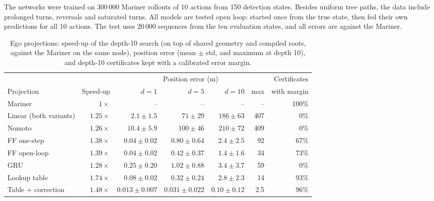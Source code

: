 \documentclass[11pt,a4paper]{article}
\begin{document}
\noindent The networks were trained on 300\,000 Mariner rollouts of 10
actions from 150 detection states. Besides uniform tree paths, the data include
prolonged turns, reversals and saturated turns. All models are tested open
loop: started once from the true state, then fed their own predictions for all
10 actions. The test uses 20\,000 sequences from the ten evaluation states, and
all errors are against the Mariner.

\begin{table}[htbp]
\centering
\caption{Ego projections: speed-up of the depth-10 search (on top of shared
geometry and compiled roots, against the Mariner on the same node), position
error (mean $\pm$ std, and maximum at depth 10), and depth-10 certificates kept
with a calibrated error margin.}
\label{tab:projection}
\small
\begin{tabular}{@{}lrrrrrr@{}}
\toprule
 & & \multicolumn{4}{c}{Position error (m)} & Certificates \\
\cmidrule(lr){3-6}
Projection & Speed-up & $d=1$ & $d=5$ & $d=10$ & max & with margin \\
\midrule
Mariner                  & $1\times$    & -- & -- & -- & -- & 100\% \\
Linear (both variants)   & $1.25\times$ & $2.1 \pm 1.5$ & $71 \pm 29$ & $186 \pm 63$ & 407 & 0\% \\
Nomoto                   & $1.26\times$ & $10.4 \pm 5.9$ & $100 \pm 46$ & $210 \pm 72$ & 409 & 0\% \\
FF one-step              & $1.38\times$ & $0.04 \pm 0.02$ & $0.80 \pm 0.64$ & $2.4 \pm 2.5$ & 92 & 67\% \\
FF open-loop             & $1.39\times$ & $0.04 \pm 0.02$ & $0.42 \pm 0.37$ & $1.4 \pm 1.6$ & 34 & 73\% \\
GRU                      & $1.28\times$ & $0.25 \pm 0.20$ & $1.02 \pm 0.88$ & $3.4 \pm 3.7$ & 59 & 0\% \\
Lookup table             & $1.74\times$ & $0.08 \pm 0.02$ & $0.32 \pm 0.24$ & $2.8 \pm 2.3$ & 14 & 93\% \\
Table + correction       & $1.48\times$ & $0.013 \pm 0.007$ & $0.031 \pm 0.022$ & $0.10 \pm 0.12$ & 2.5 & 96\% \\
\bottomrule
\end{tabular}
\end{table}
\end{document}
